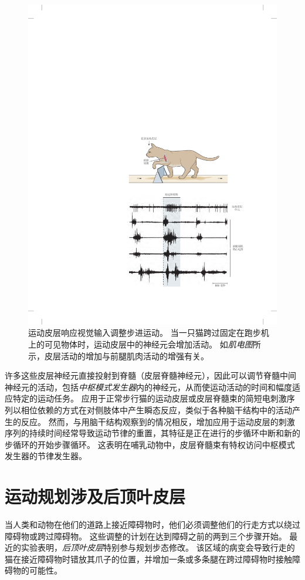 \begin{figure}[htbp]
	\centering
	\includegraphics[width=0.8\linewidth]{chap33/fig_33_14}
	\caption{运动皮层响应视觉输入调整步进运动。
		当一只猫跨过固定在跑步机上的可见物体时，运动皮层中的神经元会增加活动。
		如\textit{肌电图}所示，皮层活动的增加与前腿肌肉活动的增强有关\cite{drew1988motor}。}
	\label{fig:33_14}
\end{figure}


许多这些皮层神经元直接投射到脊髓（皮层脊髓神经元），因此可以调节脊髓中间神经元的活动，包括\textit{中枢模式发生器}内的神经元，从而使运动活动的时间和幅度适应特定的运动任务。
应用于正常步行猫的运动皮层或皮层脊髓束的简短电刺激序列以相位依赖的方式在对侧肢体中产生瞬态反应，类似于各种脑干结构中的活动产生的反应。
然而，与用脑干结构观察到的情况相反，增加应用于运动皮层的刺激序列的持续时间经常导致运动节律的重置，其特征是正在进行的步循环中断和新的步循环的开始步骤循环。
这表明在哺乳动物中，皮层脊髓束有特权访问中枢模式发生器的节律发生器。



\section{运动规划涉及后顶叶皮层}

当人类和动物在他们的道路上接近障碍物时，他们必须调整他们的行走方式以绕过障碍物或跨过障碍物。
这些调整的计划在达到障碍之前的两到三个步骤开始。
最近的实验表明，\textit{后顶叶皮层}特别参与规划步态修改。
该区域的病变会导致行走的猫在接近障碍物时错放其爪子的位置，并增加一条或多条腿在跨过障碍物时接触障碍物的可能性。


